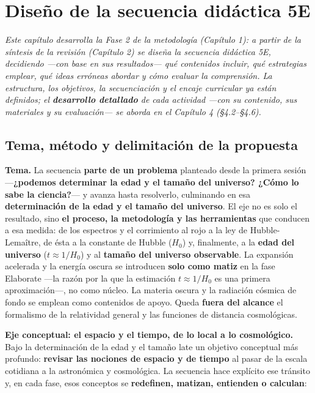 \chapter{Diseño de la secuencia didáctica 5E}\label{cap:propuesta}

\textit{Este capítulo desarrolla la Fase 2 de la metodología (Capítulo 1): a partir de la síntesis de la revisión (Capítulo 2) se diseña la secuencia didáctica 5E, decidiendo ---con base en sus resultados--- qué contenidos incluir, qué estrategias emplear, qué ideas erróneas abordar y cómo evaluar la comprensión. La estructura, los objetivos, la secuenciación y el encaje curricular ya están definidos; el \textbf{desarrollo detallado} de cada actividad ---con su contenido, sus materiales y su evaluación--- se aborda en el Capítulo 4 (§4.2--§4.6).}

\section{Tema, método y delimitación de la propuesta}\label{sec:tema}

\textbf{Tema.} La secuencia \textbf{parte de un problema} planteado desde la primera sesión ---\textbf{¿podemos determinar la edad y el tamaño del universo? ¿Cómo lo sabe la ciencia?}--- y avanza hasta resolverlo, culminando en esa \textbf{determinación de la edad y el tamaño del universo}. El eje no es solo el resultado, sino \textbf{el proceso, la metodología y las herramientas} que conducen a esa medida: de los espectros y el corrimiento al rojo a la ley de Hubble-Lemaître, de ésta a la constante de Hubble ($H_{0}$) y, finalmente, a la \textbf{edad del universo} ($t \approx 1/H_{0}$) y al \textbf{tamaño del universo observable}. La expansión acelerada y la energía oscura se introducen \textbf{solo como matiz} en la fase Elaborate ---la razón por la que la estimación $t \approx 1/H_{0}$ es una primera aproximación---, no como núcleo. La materia oscura y la radiación cósmica de fondo se emplean como contenidos de apoyo. Queda \textbf{fuera del alcance} el formalismo de la relatividad general y las funciones de distancia cosmológicas.

\textbf{Eje conceptual: el espacio y el tiempo, de lo local a lo cosmológico.} Bajo la determinación de la edad y el tamaño late un objetivo conceptual más profundo: \textbf{revisar las nociones de espacio y de tiempo} al pasar de la escala cotidiana a la astronómica y cosmológica. La secuencia hace explícito ese tránsito y, en cada fase, esos conceptos se \textbf{redefinen, matizan, entienden o calculan}:

